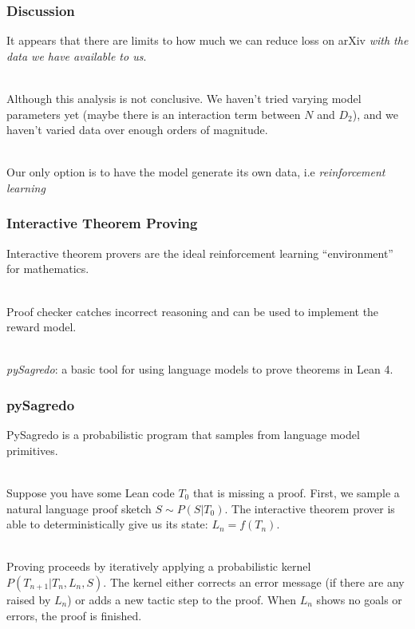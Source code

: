 \documentclass[handout]{beamer}
\begin{document}
\begin{frame}
\frametitle{Discussion}
It appears that there are limits to how much we can reduce loss on arXiv {\it with the data we have available to us}.\\~\

Although this analysis is not conclusive. We haven't tried varying model parameters yet (maybe there is an interaction term between $N$ and $D_2$), and we haven't varied data over enough orders of magnitude.\\~\

Our only option is to have the model generate its own data, i.e {\it reinforcement learning}
\end{frame}

\begin{frame}
\frametitle{Interactive Theorem Proving}
Interactive theorem provers are the ideal reinforcement learning ``environment'' for mathematics. \\~\

Proof checker catches incorrect reasoning and can be used to implement the reward model.\\~\

{\it pySagredo}: a basic tool for using language models to prove theorems in Lean 4.
\end{frame}

\begin{frame}
\frametitle{pySagredo}
PySagredo is a probabilistic program that samples from language model primitives. \\~\

Suppose you have some Lean code $T_0$ that is missing a proof. First, we sample a natural language proof sketch $S\sim P(S|T_0)$. The interactive theorem prover is able to deterministically give us its state: $L_n = f(T_n)$. \\~\

Proving proceeds by iteratively applying a probabilistic kernel $P(T_{n+1} | T_{n}, L_n, S)$. The kernel either corrects an error message (if there are any raised by $L_n$) or adds a new tactic step to the proof. When $L_n$ shows no goals or errors, the proof is finished.
\end{frame}
\end{document}
